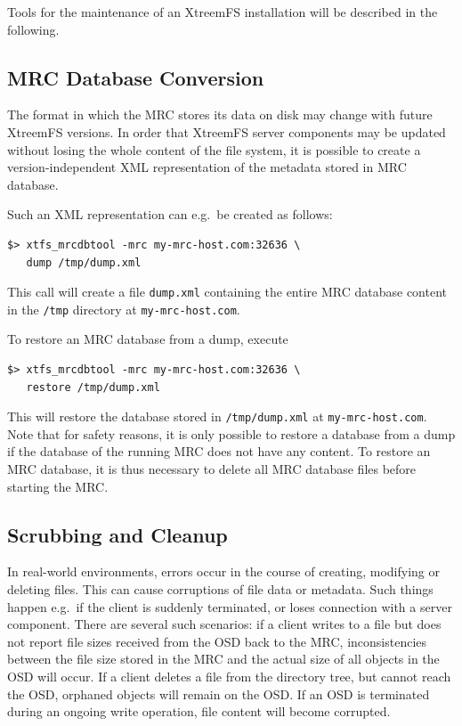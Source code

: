 \documentclass[a4paper,10pt]{book}
\begin{document}
Tools for the maintenance of an XtreemFS installation will be described in the following.

\subsection{MRC Database Conversion}

The format in which the MRC stores its data on disk may change with future XtreemFS versions. In order that XtreemFS server components may be updated without losing the whole content of the file system, it is possible to create a version-independent XML representation of the metadata stored in MRC database.

Such an XML representation can e.g.\ be created as follows:

\begin{verbatim}
$> xtfs_mrcdbtool -mrc my-mrc-host.com:32636 \
   dump /tmp/dump.xml
\end{verbatim}

This call will create a file \texttt{dump.xml} containing the entire MRC database content in the \texttt{/tmp} directory at \texttt{my-mrc-host.com}.

To restore an MRC database from a dump, execute

\begin{verbatim}
$> xtfs_mrcdbtool -mrc my-mrc-host.com:32636 \
   restore /tmp/dump.xml
\end{verbatim}

This will restore the database stored in \texttt{/tmp/dump.xml} at \texttt{my-mrc-host.com}. Note that for safety reasons, it is only possible to restore a database from a dump if the database of the running MRC does not have any content. To restore an MRC database, it is thus necessary to delete all MRC database files before starting the MRC.

\subsection{Scrubbing and Cleanup}

In real-world environments, errors occur in the course of creating, modifying or deleting files. This can cause corruptions of file data or metadata. Such things happen e.g.\ if the client is suddenly terminated, or loses connection with a server component. There are several such scenarios: if a client writes to a file but does not report file sizes received from the OSD back to the MRC, inconsistencies between the file size stored in the MRC and the actual size of all objects in the OSD will occur. If a client deletes a file from the directory tree, but cannot reach the OSD, orphaned objects will remain on the OSD. If an OSD is terminated during an ongoing write operation, file content will become corrupted.
\end{document}
